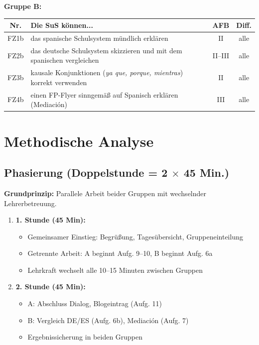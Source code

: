 \documentclass[11pt,a4paper]{article}
\begin{document}
\vspace{1em}
\textbf{Gruppe B:}

\begin{tabular}{|c|p{7cm}|c|c|}
\hline
\textbf{Nr.} & \textbf{Die SuS können...} & \textbf{AFB} & \textbf{Diff.} \\
\hline
FZ1b & das spanische Schulsystem mündlich erklären & II & alle \\
\hline
FZ2b & das deutsche Schulsystem skizzieren und mit dem spanischen vergleichen & II--III & alle \\
\hline
FZ3b & kausale Konjunktionen (\textit{ya que, porque, mientras}) korrekt verwenden & II & alle \\
\hline
FZ4b & einen FP-Flyer sinngemäß auf Spanisch erklären (Mediación) & III & alle \\
\hline
\end{tabular}

\section{Methodische Analyse}

\subsection{Phasierung (Doppelstunde = 2 $\times$ 45 Min.)}

\textbf{Grundprinzip:} Parallele Arbeit beider Gruppen mit wechselnder Lehrerbetreuung.

\begin{enumerate}
    \item \textbf{1. Stunde (45 Min):}
    \begin{itemize}
        \item Gemeinsamer Einstieg: Begrüßung, Tagesübersicht, Gruppeneinteilung
        \item Getrennte Arbeit: A beginnt Aufg. 9--10, B beginnt Aufg. 6a
        \item Lehrkraft wechselt alle 10--15 Minuten zwischen Gruppen
    \end{itemize}
    \item \textbf{2. Stunde (45 Min):}
    \begin{itemize}
        \item A: Abschluss Dialog, Blogeintrag (Aufg. 11)
        \item B: Vergleich DE/ES (Aufg. 6b), Mediación (Aufg. 7)
        \item Ergebnissicherung in beiden Gruppen
    \end{itemize}
\end{enumerate}
\end{document}
